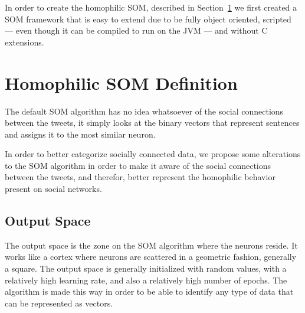 In order to create the homophilic \ac{SOM}, described in Section~\ref{sec:algorithm_changes} we first created a \ac{SOM} framework that is easy to extend due to be fully object oriented, scripted --- even though it can be compiled to run on the JVM --- and without C extensions.



\section{Homophilic SOM Definition}
\label{sec:algorithm_changes}
The default \ac{SOM} algorithm has no idea whatsoever of the social connections between the tweets, it simply looks at the binary vectors that represent sentences and assigns it to the most similar neuron.

In order to better categorize socially connected data, we propose some alterations to the \ac{SOM} algorithm in order to make it aware of the social connections between the tweets, and therefor, better represent the homophilic behavior present on social networks.

\subsection{Output Space}
\label{sub:output_space}
The output space is the zone on the \ac{SOM} algorithm where the neurons reside. It works like a cortex where neurons are scattered in a geometric fashion, generally a square. The output space is generally initialized with random values, with a relatively high learning rate, and also a relatively high number of epochs. The algorithm is made this way in order to be able to identify any type of data that can be represented as vectors.

